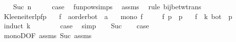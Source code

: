 \begin{isabellebody}
\isamarkupfalse%
\isanewline
\ \ \isamarkupfalse%
\ {\isacharparenleft}{\kern0pt}Suc\ n{\isacharparenright}{\kern0pt}\isanewline
\ \ \isamarkupfalse%
\ \isamarkupfalse%
\ {\isacharquery}{\kern0pt}case\ \isamarkupfalse%
\ funpow{\isachardot}{\kern0pt}simps\ \isamarkupfalse%
\ assms\ \isamarkupfalse%
\ {\isacharparenleft}{\kern0pt}rule\ bij{\isacharunderscore}{\kern0pt}betw{\isacharunderscore}{\kern0pt}trans{\isacharparenright}{\kern0pt}\isanewline
{}\isamarkupfalse%
%
\endisatagproof
{\isafoldproof}%
%
\isadelimproof
%
\endisadelimproof
%
\isadelimdocument
%
\endisadelimdocument
%
\isatagdocument
%
\isamarkuptrue%
%
\endisatagdocument
{\isafolddocument}%
%
\isadelimdocument
%
\endisadelimdocument
{}\isamarkupfalse%
\ Kleene{\isacharunderscore}{\kern0pt}iter{\isacharunderscore}{\kern0pt}lpfp{\isacharcolon}{\kern0pt}\isanewline
\ \ \ f\ {\isacharcolon}{\kern0pt}{\isacharcolon}{\kern0pt}\ {\isachardoublequoteopen}{\isacharprime}{\kern0pt}a{\isacharcolon}{\kern0pt}{\isacharcolon}{\kern0pt}order{\isacharunderscore}{\kern0pt}bot\ {\isasymRightarrow}\ {\isacharprime}{\kern0pt}a{\isachardoublequoteclose}\isanewline
\ \ \ {\isachardoublequoteopen}mono\ f{\isachardoublequoteclose}\isanewline
\ \ \ \ \ {\isachardoublequoteopen}f\ p\ {\isasymle}\ p{\isachardoublequoteclose}\isanewline
\ \ \ {\isachardoublequoteopen}{\isacharparenleft}{\kern0pt}f\ {\isacharcircum}{\kern0pt}{\isacharcircum}{\kern0pt}\ k{\isacharparenright}{\kern0pt}\ bot\ {\isasymle}\ p{\isachardoublequoteclose}\isanewline
%
\isadelimproof
%
\endisadelimproof
%
\isatagproof
{}\isamarkupfalse%
\ {\isacharparenleft}{\kern0pt}induct\ k{\isacharparenright}{\kern0pt}\isanewline
\ \ \isamarkupfalse%
\ {}\isanewline
\ \ \isamarkupfalse%
\ {\isacharquery}{\kern0pt}case\ \isamarkupfalse%
\ simp\isanewline
{}\isamarkupfalse%
\isanewline
\ \ \isamarkupfalse%
\ Suc\isanewline
\ \ \isamarkupfalse%
\ {\isacharquery}{\kern0pt}case\isanewline
\ \ \ \ \isamarkupfalse%
\ monoD{\isacharbrackleft}{\kern0pt}OF\ assms{\isacharparenleft}{\kern0pt}{}{\isacharparenright}{\kern0pt}\ Suc{\isacharbrackright}{\kern0pt}\ assms{\isacharparenleft}{\kern0pt}{}{\isacharparenright}{\kern0pt}\ \isamarkupfalse%

\end{isabellebody}
